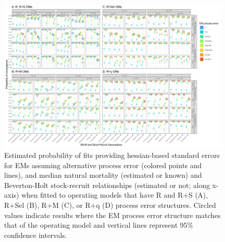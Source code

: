 \documentclass[
  12pt,
]{article}
\begin{document}
\pagebreak

\clearpage

\begin{landscape}
\begin{figure}
\begin{center}
\includegraphics{type_4_convergence_plots}
\end{center}
\caption{Estimated probability of fits providing hessian-based standard errors for EMs assuming alternative process error (colored points and lines), and median natural mortality (estimated or known) and Beverton-Holt stock-recruit relationships (estimated or not; along x-axis) when fitted to operating models that have R and R+S (A), R+Sel (B), R+M (C), or R+q (D) process error structures. Circled values indicate results where the EM process error structure matches that of the operating model and vertical lines represent 95\% confidence intervals.}\label{hessian_SE_convergence}
\end{figure}
\end{landscape}

\clearpage
\end{document}
